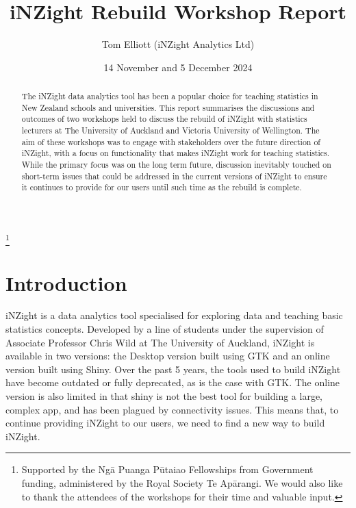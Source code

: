 \documentclass{article}
\title{iNZight Rebuild Workshop Report}
\author{Tom Elliott (iNZight Analytics Ltd)}
\date{14 November and 5 December 2024}
\begin{document}
\begin{titlepage}
    \maketitle

    \begin{abstract}
        The iNZight data analytics tool has been a popular choice for teaching statistics in New Zealand schools and universities. This report summarises the discussions and outcomes of two workshops held to discuss the rebuild of iNZight with statistics lecturers at The University of Auckland and Victoria University of Wellington. The aim of these workshops was to engage with stakeholders over the future direction of iNZight, with a focus on functionality that makes iNZight work for teaching statistics. While the primary focus was on the long term future, discussion inevitably touched on short-term issues that could be addressed in the current versions of iNZight to ensure it continues to provide for our users until such time as the rebuild is complete.
    \end{abstract}

    \vfill

    \centering
    \thanks{\noindent Supported by the Ngā Puanga Pūtaiao Fellowships from
    Government funding, administered by the Royal Society Te Apārangi. We would also like to thank the attendees of the workshops for their time and valuable input.}
\end{titlepage}


\section{Introduction}

iNZight is a data analytics tool specialised for exploring data and teaching basic statistics concepts.
Developed by a line of students under the supervision of Associate Professor Chris Wild at The University of Auckland, iNZight is available in two versions: the Desktop version built using GTK and an online version built using Shiny\cite{Chang2021}.
Over the past 5 years, the tools used to build iNZight have become outdated or fully deprecated, as is the case with GTK.
The online version is also limited in that shiny is not the best tool for building a large, complex app, and has been plagued by connectivity issues.
This means that, to continue providing iNZight to our users, we need to find a new way to build iNZight.
\end{document}
